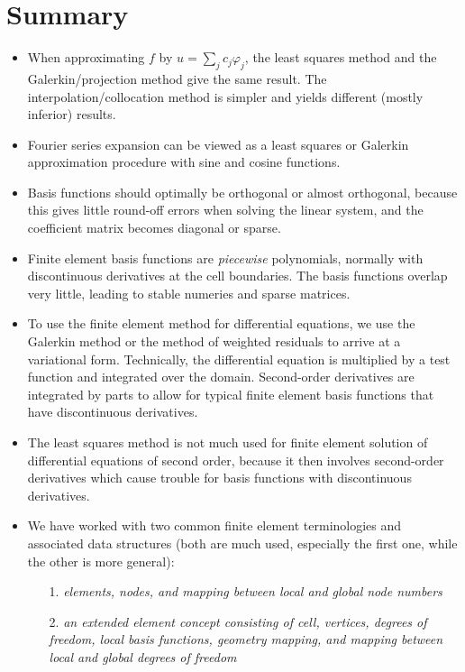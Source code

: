 \documentclass[../main.tex]{subfiles}
\begin{document}
	\chapter{Summary}
\label{chap:chap_18}
\begin{itemize}
	\item When approximating $f$ by $u=\sum_{j} c_{j} \varphi_{j}$, the least squares method and the Galerkin/projection method give the same result. The interpolation/collocation method is simpler and yields different (mostly inferior) results.
	\item Fourier series expansion can be viewed as a least squares or Galerkin approximation procedure with sine and cosine functions.
	\item Basis functions should optimally be orthogonal or almost orthogonal, because this gives little round-off errors when solving the linear system, and the coefficient matrix becomes diagonal or sparse.
	\item Finite element basis functions are \emph{piecewise} polynomials, normally with discontinuous derivatives at the cell boundaries. The basis functions overlap very little, leading to stable numeries and sparse matrices.
	\item To use the finite element method for differential equations, we use the Galerkin method or the method of weighted residuals to arrive at a variational form. Technically, the differential equation is multiplied by a test function and integrated over the domain. Second-order derivatives are integrated by parts to allow for typical finite element basis functions that have discontinuous derivatives.
	\item The least squares method is not much used for finite element solution of differential equations of second order, because it then involves second-order derivatives which cause trouble for basis functions with discontinuous derivatives.
	\item We have worked with two common finite element terminologies and associated data structures (both are much used, especially the first one, while the other is more general):
		\begin{enumerate}
			\item[1.] \emph{elements, nodes, and mapping between local and global node numbers}
			\item[2.] \emph{an extended element concept consisting of cell, vertices, degrees of freedom, local basis functions, geometry mapping, and mapping between local and global degrees of freedom}

\end{enumerate}
\end{itemize}
\end{document}
